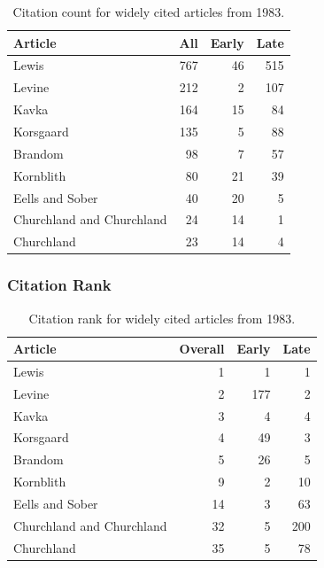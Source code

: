 \documentclass[
  10pt,
  letterpaper,
  DIV=11,
  numbers=noendperiod,
  twoside]{scrartcl}
\begin{document}
\begin{longtable}[]{@{}lrrr@{}}

\caption{\label{tbl-citation-count-1983}Citation count for widely cited
articles from 1983.}

\tabularnewline

\toprule\noalign{}
Article & All & Early & Late \\
\midrule\noalign{}
\endhead
\bottomrule\noalign{}
\endlastfoot
Lewis & 767 & 46 & 515 \\
Levine & 212 & 2 & 107 \\
Kavka & 164 & 15 & 84 \\
Korsgaard & 135 & 5 & 88 \\
Brandom & 98 & 7 & 57 \\
Kornblith & 80 & 21 & 39 \\
Eells and Sober & 40 & 20 & 5 \\
Churchland and Churchland & 24 & 14 & 1 \\
Churchland & 23 & 14 & 4 \\

\end{longtable}

\subsubsection*{Citation Rank}\label{citation-rank-7}

\begin{longtable}[]{@{}lrrr@{}}

\caption{\label{tbl-citation-rank-1983}Citation rank for widely cited
articles from 1983.}

\tabularnewline

\toprule\noalign{}
Article & Overall & Early & Late \\
\midrule\noalign{}
\endhead
\bottomrule\noalign{}
\endlastfoot
Lewis & 1 & 1 & 1 \\
Levine & 2 & 177 & 2 \\
Kavka & 3 & 4 & 4 \\
Korsgaard & 4 & 49 & 3 \\
Brandom & 5 & 26 & 5 \\
Kornblith & 9 & 2 & 10 \\
Eells and Sober & 14 & 3 & 63 \\
Churchland and Churchland & 32 & 5 & 200 \\
Churchland & 35 & 5 & 78 \\

\end{longtable}
\end{document}
